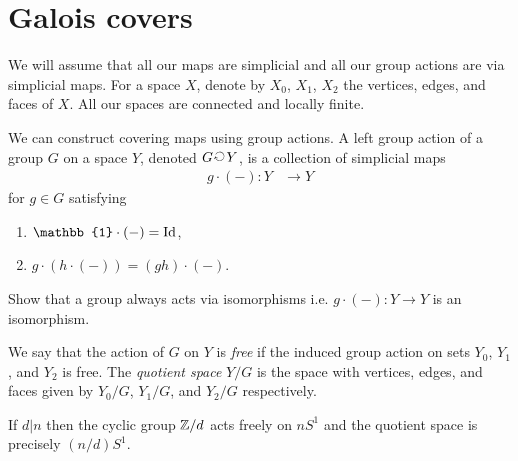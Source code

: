 
\section{Galois covers}
\label{sec:GaloisCovers}

We  will assume that all our maps are simplicial and all our group actions are via simplicial maps.
For a space $X$, denote by $X_0$, $X_1$, $X_2$ the vertices, edges, and faces of $X$.
All our spaces are connected and locally finite.

We can construct covering maps using group actions.
A left group action of a group  $G$ on a space $Y$, denoted $G \groupaction Y$, is a collection of simplicial maps
\begin{align*}
  g \cdot (-) : Y &\longrightarrow Y
\end{align*}
for $g \in G$ satisfying
\begin{enumerate}
  \item ${\mathbb{1}} \cdot (-) = \id$,
  \item $g \cdot (h \cdot (-)) = (gh) \cdot (-)$.
\end{enumerate}
\begin{qbox}
  Show that a group always acts via isomorphisms i.e. $g \cdot (-) : Y \rightarrow Y$ is an isomorphism.
\end{qbox}

\begin{definition}
  We say that the action of $G$ on $Y$ is \emph{free} if the induced group action on sets $Y_0$, $Y_1$, and $Y_2$ is free.
  The \emph{quotient space} $Y/G$ is the space with vertices, edges, and faces given by $Y_0/G$, $Y_1/G$, and $Y_2/G$ respectively.
\end{definition}

\begin{ex}
  If $d | n$ then the cyclic group $\mathbb{Z}/d$ acts freely on $nS^1$ and the quotient space is precisely $(n/d)S^1$.
\end{ex}

